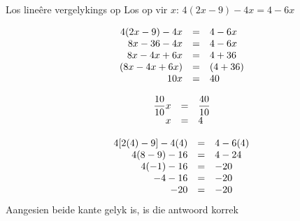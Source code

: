 \begin{wex}
{Los line\^ere vergelykings op }
{Los op vir $x$: $4(2x-9)-4x=4-6x$}
{

\begin{equation*}
    \begin{array}{ccl}\hfill 4(2x-9)-4x& =& 4-6x\hfill  \\ 
	\hfill 8x-36-4x& =& 4-6x\hfill   \\ 
	\hfill 8x-4x+6x& =& 4+36\hfill  \\ 
	\hfill (8x-4x+6x)& =& (4+36)\hfill   \\   
	\hfill 10x& =& 40\hfill  
    \end{array}
\end{equation*}

\begin{equation*}
    \begin{array}{ccl}
	\hfill \dfrac{10}{10}x& =& \dfrac{40}{10}\hfill\\
	\hfill x& =& 4\hfill  
    \end{array}
\end{equation*}


\begin{equation*}
    \begin{array}{ccl}\hfill 4[2(4)-9]-4(4)& =& 4-6(4)\hfill \\
	\hfill 4(8-9)-16& =& 4-24\hfill \\
	\hfill 4(-1)-16& =& -20\hfill \\
	\hfill -4-16& =& -20\hfill \\
	\hfill -20& =& -20\hfill 
    \end{array}
\end{equation*}
Aangesien beide kante gelyk is, is die antwoord korrek 
}
\end{wex}

